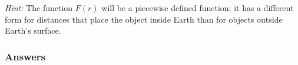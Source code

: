 \documentclass{exam}
\begin{document}
\begin{questions}
\begin{enumerate}
\end{enumerate}

\textit{Hint:}  The function  $F(r)$ will be a piecewise defined function; it has a different form for distances that place the object inside Earth than for objects outside Earth's surface. 

\color{blue}
\subsubsection*{Answers}
\end{questions}
\end{document}
